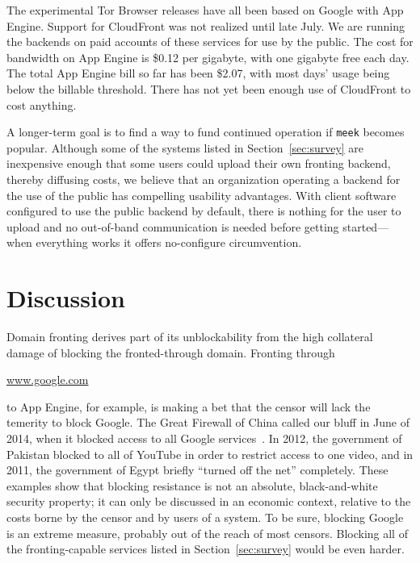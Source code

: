 \documentclass[conference]{IEEEtran}
\newcommand{\meek}{\texttt{meek}\xspace}
\def\urll#1{\begin{NoHyper}\url{#1}\end{NoHyper}}
\begin{document}
The experimental Tor Browser releases have all been based on Google with App Engine.
Support for CloudFront was not realized until late July.
We are running the backends on paid accounts of these services for use by the public.
The cost for bandwidth on App Engine is \$0.12 per gigabyte,
with one gigabyte free each day.
The total App Engine bill so far has been \$2.07,
with most days' usage being below the billable threshold.
There has not yet been enough use of CloudFront to cost anything.

A longer-term goal is to find a way to fund continued operation
if \meek becomes popular.
Although some of the systems listed in Section~\ref{sec:survey}
are inexpensive enough that some users could upload their own fronting backend,
thereby diffusing costs,
we believe that an organization operating a backend for the use of the public
has compelling usability advantages.
With client software configured to use the public backend by default,
there is nothing for the user to upload and no out-of-band communication is needed before getting
started---when everything works it offers no-configure circumvention.


\section{Discussion}
\label{sec:discussion}

Domain fronting derives part of its unblockability from the
high collateral damage of blocking the fronted-through domain.
Fronting through \urll{www.google.com} to App Engine, for example,
is making a bet that the censor will lack the temerity to block Google.
The Great Firewall of China called our bluff in June of 2014,
when it blocked access to all Google services~\cite{cn-google-block}.
In 2012, the government of Pakistan blocked to all of YouTube
in order to restrict access to one video,
and in 2011, the government of Egypt briefly ``turned off the net'' completely.
These examples show that blocking resistance is not an absolute,
black-and-white security property;
it can only be discussed in an economic context, relative to the costs borne
by the censor and by users of a system.
To be sure, blocking Google is an extreme measure,
probably out of the reach of most censors.
Blocking all of the fronting-capable services listed in
Section~\ref{sec:survey} would be even harder.
\end{document}

